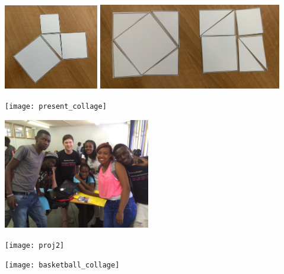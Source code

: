 \documentclass{beamer}
\begin{document}
\begin{frame}
\begin{center}
\includegraphics[width=0.31\textwidth]{pythag1}
\hspace{5mm}
\includegraphics[width=0.6\textwidth]{pythag2}
\end{center}
\end{frame}

\begin{frame}
\begin{center}
\texttt{[image: present\_collage]}
\end{center}
\end{frame}

\begin{frame}
\begin{center}
\includegraphics[width=0.48\textwidth]{proj1}
\end{center}
\begin{center}
\texttt{[image: proj2]}
\end{center}
\end{frame}


\begin{frame}
\begin{center}
\texttt{[image: basketball\_collage]}
\end{center}
\end{frame}
\end{document}
